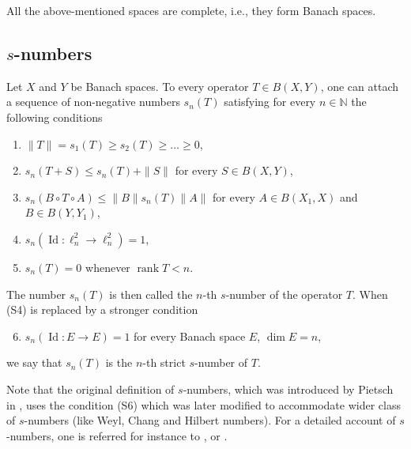 \documentclass[10pt,reqno]{amsart}
\def\N{\mathbb{N}}
\def\dim{\operatorname{dim}}
\def\rank{\operatorname{rank}}
\numberwithin{equation}{section}
\def\Id{\mathop{\mathrm{Id}}}
\begin{document}
All the above-mentioned spaces are complete, i.e., they form Banach spaces.


\subsection{$s$-numbers}


Let $X$ and $Y$ be Banach spaces.
To every operator $T \in B(X, Y)$, one can attach a sequence of non-negative
numbers $s_n(T)$ satisfying for every $n\in\N$ the following conditions
\begin{enumerate}[(S1)]
	\item $\| T \| = s_1(T) \geq s_2 (T) \geq \dots \geq 0$,
	\item $s_n(T + S) \leq s_n (T) + \|S\|$ for every $S \in B(X, Y)$,
	\item $s_n(B\circ T\circ A) \leq \| B \| s_n(T) \| A \|$
		for every $A \in B(X_1, X)$ and $B \in B(Y,Y_1)$,
	\item $s_n( \Id\colon \ell_n^2 \rightarrow \ell_n^2) = 1$,
	\item $s_n(T) = 0$ whenever $\rank T< n$.
\end{enumerate}
The number $s_n(T)$ is then called the $n$-th $s$-number of the operator $T$.
When (S4) is replaced by a stronger condition
\begin{enumerate}[(S1)] \setcounter{enumi}{5}
	\item $s_n( \Id\colon E\to E) = 1$ for every Banach space $E$, $\dim E = n$,
\end{enumerate}
we say that $s_n(T)$ is the $n$-th strict $s$-number of $T$. 

Note that the original definition of $s$-numbers, which was introduced by Pietsch
in \citep{PietschStudia}, uses the condition (S6)
which was later modified to accommodate wider class of $s$-numbers (like Weyl, Chang and
Hilbert numbers).
For a detailed account of $s$-numbers, one is referred for instance to
\cite{PietschBook}, \cite{CSBook} or \citep{ELBook}.
\end{document}
